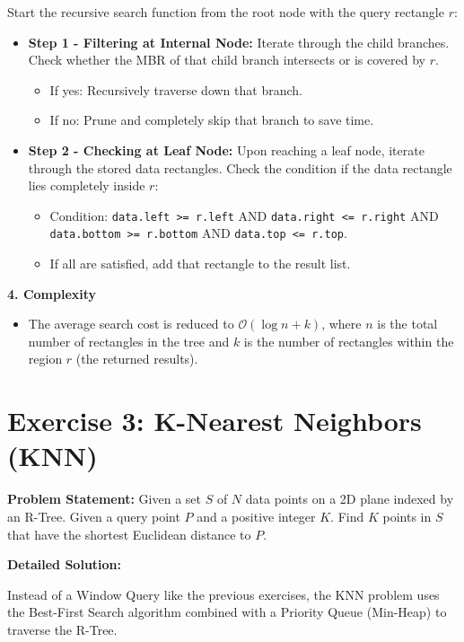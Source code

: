 \documentclass[a4paper, 10pt, titlepage]{report}
\begin{document}
Start the recursive search function from the root node with the query rectangle $r$:
\begin{itemize}
    \item \textbf{Step 1 - Filtering at Internal Node:} Iterate through the child branches. Check whether the MBR of that child branch intersects or is covered by $r$.
    \begin{itemize}
        \item If yes: Recursively traverse down that branch.
        \item If no: Prune and completely skip that branch to save time.
    \end{itemize}
    \item \textbf{Step 2 - Checking at Leaf Node:} Upon reaching a leaf node, iterate through the stored data rectangles. Check the condition if the data rectangle lies completely inside $r$:
    \begin{itemize}
        \item Condition: \texttt{data.left >= r.left} AND \texttt{data.right <= r.right} AND \texttt{data.bottom >= r.bottom} AND \texttt{data.top <= r.top}.
        \item If all are satisfied, add that rectangle to the result list.
    \end{itemize}
\end{itemize}

\textbf{4. Complexity}
\begin{itemize}
    \item The average search cost is reduced to $\mathcal{O}(\log n + k)$, where $n$ is the total number of rectangles in the tree and $k$ is the number of rectangles within the region $r$ (the returned results).
\end{itemize}

\vspace{0.5cm}

\section{Exercise 3: K-Nearest Neighbors (KNN)}
\textbf{Problem Statement:} Given a set $S$ of $N$ data points on a 2D plane indexed by an R-Tree. Given a query point $P$ and a positive integer $K$. Find $K$ points in $S$ that have the shortest Euclidean distance to $P$.

\textbf{Detailed Solution:}

Instead of a Window Query like the previous exercises, the KNN problem uses the Best-First Search algorithm combined with a Priority Queue (Min-Heap) to traverse the R-Tree.
\end{document}
